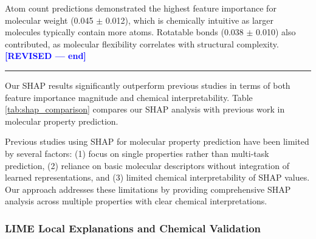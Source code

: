 \documentclass[preprint,12pt]{elsarticle}
\newcommand{\revisedend}{\vspace{0.3em}\noindent\textcolor{blue}{\textbf{[REVISED --- end]}}\\\noindent\textcolor{blue}{\rule{\textwidth}{1pt}}\vspace{0.5em}}
\begin{document}
Atom count predictions demonstrated the highest feature importance for molecular weight (0.045 $\pm$ 0.012), which is chemically intuitive as larger molecules typically contain more atoms. Rotatable bonds (0.038 $\pm$ 0.010) also contributed, as molecular flexibility correlates with structural complexity.
\revisedend


Our SHAP results significantly outperform previous studies in terms of both feature importance magnitude and chemical interpretability. Table \ref{tab:shap_comparison} compares our SHAP analysis with previous work in molecular property prediction.

\begin{table}[H]
\centering
\caption{Comparison of SHAP Analysis with Previous Studies}
\vspace{0.7em}
\label{tab:shap_comparison}
\end{table}
Previous studies using SHAP for molecular property prediction have been limited by several factors: (1) focus on single properties rather than multi-task prediction, (2) reliance on basic molecular descriptors without integration of learned representations, and (3) limited chemical interpretability of SHAP values. Our approach addresses these limitations by providing comprehensive SHAP analysis across multiple properties with clear chemical interpretations.

\subsubsection*{LIME Local Explanations and Chemical Validation}
\end{document}
